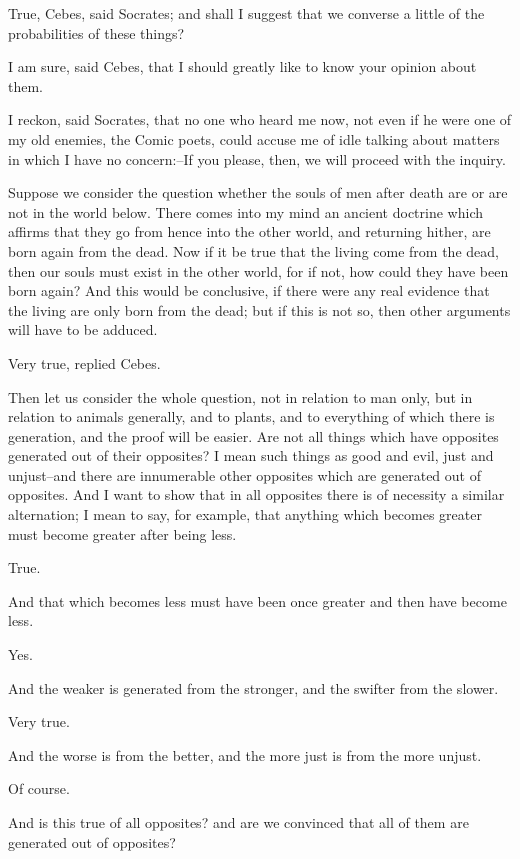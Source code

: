 True, Cebes, said Socrates; and shall I suggest that we converse a
little of the probabilities of these things?

I am sure, said Cebes, that I should greatly like to know your opinion
about them.

I reckon, said Socrates, that no one who heard me now, not even if he
were one of my old enemies, the Comic poets, could accuse me of idle
talking about matters in which I have no concern:--If you please, then,
we will proceed with the inquiry.

Suppose we consider the question whether the souls of men after death
are or are not in the world below. There comes into my mind an ancient
doctrine which affirms that they go from hence into the other world, and
returning hither, are born again from the dead. Now if it be true that
the living come from the dead, then our souls must exist in the other
world, for if not, how could they have been born again? And this would
be conclusive, if there were any real evidence that the living are only
born from the dead; but if this is not so, then other arguments will
have to be adduced.

Very true, replied Cebes.

Then let us consider the whole question, not in relation to man only,
but in relation to animals generally, and to plants, and to everything
of which there is generation, and the proof will be easier. Are not all
things which have opposites generated out of their opposites? I mean
such things as good and evil, just and unjust--and there are innumerable
other opposites which are generated out of opposites. And I want to show
that in all opposites there is of necessity a similar alternation;
I mean to say, for example, that anything which becomes greater must
become greater after being less.

True.

And that which becomes less must have been once greater and then have
become less.

Yes.

And the weaker is generated from the stronger, and the swifter from the
slower.

Very true.

And the worse is from the better, and the more just is from the more
unjust.

Of course.

And is this true of all opposites? and are we convinced that all of them
are generated out of opposites?

